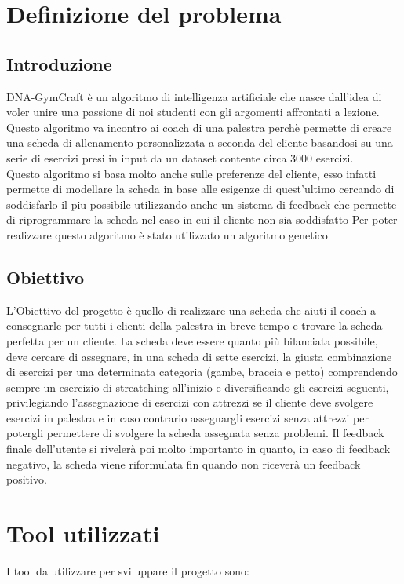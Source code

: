 \documentclass{book}
\begin{document}
\newpage
\section{Definizione del problema}
\subsection{Introduzione}
DNA-GymCraft è un algoritmo di intelligenza artificiale che nasce dall'idea di voler unire una passione di noi studenti con gli argomenti affrontati a lezione.\\ Questo algoritmo va incontro ai coach di una palestra perchè permette di creare una scheda di allenamento personalizzata a seconda del cliente basandosi su una serie di esercizi presi in input da un dataset contente circa 3000 esercizi. \\
\noindent
Questo algoritmo si basa molto anche sulle preferenze del cliente, esso infatti permette di modellare la scheda in base alle esigenze di quest'ultimo cercando di soddisfarlo il piu possibile utilizzando anche un sistema di feedback che permette di riprogrammare la scheda nel caso in cui il cliente non sia soddisfatto
Per poter realizzare questo algoritmo è stato utilizzato un algoritmo genetico
\subsection{Obiettivo}
L'Obiettivo del progetto è quello di realizzare una scheda che aiuti il coach a consegnarle per tutti i clienti della palestra in breve tempo e trovare la scheda perfetta per un cliente. La scheda deve essere quanto più bilanciata possibile, deve cercare di assegnare, in una scheda di sette esercizi, la giusta combinazione di esercizi per una determinata categoria (gambe, braccia e petto) comprendendo sempre un esercizio di streatching all'inizio e diversificando gli esercizi seguenti, privilegiando l'assegnazione di esercizi con attrezzi se il cliente  deve svolgere esercizi in palestra e in caso contrario assegnargli esercizi senza attrezzi per potergli permettere di svolgere la scheda assegnata senza problemi. Il feedback finale dell'utente si rivelerà poi molto importanto in quanto, in caso di feedback negativo, la scheda viene riformulata fin quando non riceverà un feedback positivo.
\section*{Tool utilizzati}
            \newline
            \noindent I tool da utilizzare per sviluppare il progetto sono:
            
\end{document}
